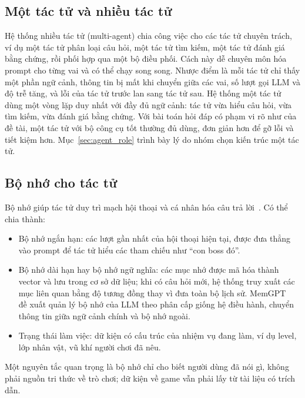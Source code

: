 \subsection{Một tác tử và nhiều tác tử}
\label{sec:single_multi}

Hệ thống nhiều tác tử (multi-agent) chia công việc cho các tác tử chuyên trách, ví dụ một tác tử phân loại câu hỏi, một tác tử tìm kiếm, một tác tử đánh giá bằng chứng, rồi phối hợp qua một bộ điều phối. Cách này dễ chuyên môn hóa prompt cho từng vai và có thể chạy song song. Nhược điểm là mỗi tác tử chỉ thấy một phần ngữ cảnh, thông tin bị mất khi chuyển giữa các vai, số lượt gọi LLM và độ trễ tăng, và lỗi của tác tử trước lan sang tác tử sau. Hệ thống một tác tử dùng một vòng lặp duy nhất với đầy đủ ngữ cảnh: tác tử vừa hiểu câu hỏi, vừa tìm kiếm, vừa đánh giá bằng chứng. Với bài toán hỏi đáp có phạm vi rõ như của đề tài, một tác tử với bộ công cụ tốt thường đủ dùng, đơn giản hơn để gỡ lỗi và tiết kiệm hơn. Mục~\ref{sec:agent_role} trình bày lý do nhóm chọn kiến trúc một tác tử.

\subsection{Bộ nhớ cho tác tử}
\label{sec:memory}

Bộ nhớ giúp tác tử duy trì mạch hội thoại và cá nhân hóa câu trả lời~\cite{wang2024agentsurvey}. Có thể chia thành:
\begin{itemize}
    \item Bộ nhớ ngắn hạn: các lượt gần nhất của hội thoại hiện tại, được đưa thẳng vào prompt để tác tử hiểu các tham chiếu như ``con boss đó''.
    \item Bộ nhớ dài hạn hay bộ nhớ ngữ nghĩa: các mục nhớ được mã hóa thành vector và lưu trong cơ sở dữ liệu; khi có câu hỏi mới, hệ thống truy xuất các mục liên quan bằng độ tương đồng thay vì đưa toàn bộ lịch sử. MemGPT~\cite{packer2023memgpt} đề xuất quản lý bộ nhớ của LLM theo phân cấp giống hệ điều hành, chuyển thông tin giữa ngữ cảnh chính và bộ nhớ ngoài.
    \item Trạng thái làm việc: dữ kiện có cấu trúc của nhiệm vụ đang làm, ví dụ level, lớp nhân vật, vũ khí người chơi đã nêu.
\end{itemize}
Một nguyên tắc quan trọng là bộ nhớ chỉ cho biết người dùng đã nói gì, không phải nguồn tri thức về trò chơi; dữ kiện về game vẫn phải lấy từ tài liệu có trích dẫn.

